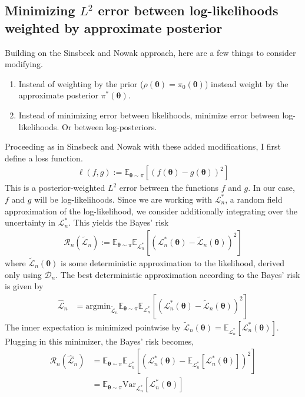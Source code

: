 \documentclass[12pt]{article}
\newcommand{\E}{\mathbb{E}}
\newcommand{\Var}{\mathrm{Var}}
\newcommand{\btheta}{\boldsymbol{\theta}}
\begin{document}
\subsection{Minimizing $L^2$ error between log-likelihoods weighted by approximate posterior}
Building on the Sinsbeck and Nowak approach, here are a few things to consider modifying. 
\begin{enumerate}
\item Instead of weighting by the prior ($\rho(\btheta) = \pi_0(\btheta)$) instead weight by the approximate posterior $\pi^*(\btheta)$. 
\item Instead of minimizing error between likelihoods, minimize error between log-likelihoods. Or between log-posteriors. 
\end{enumerate}

Proceeding as in Sinsbeck and Nowak with these added modifications, I first define a loss function. 
\begin{align*}
\ell(f, g) := \E_{\btheta \sim \pi} \left[\left(f(\btheta) - g(\btheta) \right)^2 \right]
\end{align*}
This is a posterior-weighted $L^2$ error between the functions $f$ and $g$. In our case, $f$ and $g$ will be log-likelihoods. Since we are working with 
$\mathcal{L}_n^*$, a random field approximation of the log-likelihood, we consider additionally integrating over the uncertainty in $\mathcal{L}_n^*$. This 
yields the Bayes' risk 
\begin{align*}
\mathcal{R}_n(\tilde{\mathcal{L}}_n) := \E_{\btheta \sim \pi} \E_{\mathcal{L}_n^*}\left[\left(\mathcal{L}_n^*(\btheta) - \tilde{\mathcal{L}}_n(\btheta) \right)^2 \right]
\end{align*}
where $\tilde{\mathcal{L}}_n(\btheta)$ is some deterministic approximation to the likelihood, derived only using $\mathcal{D}_n$. The best deterministic approximation 
according to the Bayes' risk is given by 
\begin{align*}
\hat{\mathcal{L}}_n &= \text{argmin}_{\tilde{\mathcal{L}}_n} \E_{\btheta \sim \pi} \E_{\mathcal{L}_n^*}\left[\left(\mathcal{L}_n^*(\btheta) - \tilde{\mathcal{L}}_n(\btheta) \right)^2 \right]
\end{align*}
The inner expectation is minimized pointwise by $\tilde{\mathcal{L}}_n(\btheta) = \E_{\mathcal{L}_n^*}\left[\mathcal{L}_n^*(\btheta) \right]$. Plugging in this minimizer, the Bayes' 
risk becomes, 
\begin{align*}
\mathcal{R}_n(\hat{\mathcal{L}}_n) &=  \E_{\btheta \sim \pi} \E_{\mathcal{L}_n^*}\left[\left(\mathcal{L}_n^*(\btheta) - \E_{\mathcal{L}_n^*}\left[\mathcal{L}^*_n(\btheta)\right] \right)^2 \right] \\
						      &= \E_{\btheta \sim \pi} \Var_{\mathcal{L}_n^*}\left[\mathcal{L}_n^*(\btheta) \right]
\end{align*}
\end{document}
